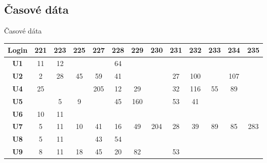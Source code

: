 \documentclass[xcolor={table}]{beamer}
\begin{document}
		\subsection{Časové dáta}
			\begin{frame}{Časové dáta}
\begin{table}[]
\centering
\tiny
\begin{tabular}{|c|c|c|c|c|c|c|c|c|c|c|c|c|}
\hline
\textbf{Login} & \textbf{221} & \textbf{223} & \textbf{225} & \textbf{227} & \textbf{228} & \textbf{229} & \textbf{230} & \textbf{231} & \textbf{232} & \textbf{233} & \textbf{234} & \textbf{235} \\ \hline
\textbf{U1}    & 11           & 12           &              &              & 64           &              &              &              &              &              &              &              \\ \hline
\textbf{U2}    & 2            & 28           & 45           & 59           & 41           &              &              & 27           & 100          &              & 107          &              \\ \hline
\textbf{U4}    & 25           &              &              & 205          & 12           & 29           &              & 32           & 116          & 55           & 89           &              \\ \hline
\textbf{U5}    &              & 5            & 9            &              & 45           & 160          &              & 53           & 41           &              &              &              \\ \hline
\textbf{U6}    & 10           & 11           &              &              &              &              &              &              &              &              &              &              \\ \hline
\textbf{U7}    & 5            & 11           & 10           & 41           & 16           & 49           & 204          & 28           & 39           & 89           & 85           & 283          \\ \hline
\textbf{U8}    & 5            & 11           &              & 43           & 54           &              &              &              &              &              &              &              \\ \hline
\textbf{U9}    & 8            & 11           & 18           & 45           & 20           & 82           &              & 53           &              &              &              &              \\ \hline

\end{tabular}
\end{table}
\end{frame}
\end{document}
